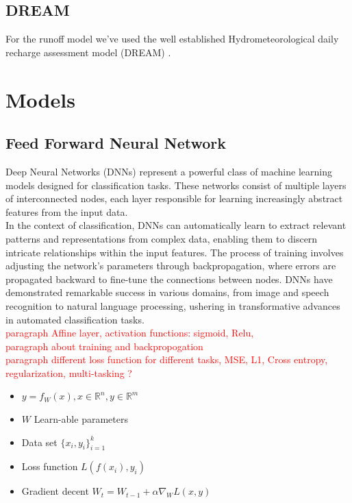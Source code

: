 \documentclass[12pt]{report}
\begin{document}
\subsection{DREAM}

For the runoff model we've used the well established Hydrometeorological daily recharge assessment model (DREAM) \cite{DREAM}.
\newpage
\section{Models}
\subsection{Feed Forward Neural Network}
Deep Neural Networks (DNNs) represent a powerful class of machine learning models designed for classification tasks. These networks consist of multiple layers of interconnected nodes, each layer responsible for learning increasingly abstract features from the input data.\\ 

In the context of classification, DNNs can automatically learn to extract relevant patterns and representations from complex data, enabling them to discern intricate relationships within the input features. The process of training involves adjusting the network's parameters through backpropagation, where errors are propagated backward to fine-tune the connections between nodes. DNNs have demonstrated remarkable success in various domains, from image and speech recognition to natural language processing, ushering in transformative advances in automated classification tasks.\\

\textcolor{red}{paragraph Affine layer, activation functions:  sigmoid, Relu, }\\

\textcolor{red}{paragraph about training and backpropogation}\\

\textcolor{red}{paragraph different loss function for different tasks, MSE, L1, Cross entropy, regularization, multi-tasking ?}\\




\begin{itemize}
	\item $y = f_{W}(x), x \in \mathbb{R}^n, y \in \mathbb{R}^m$ 
	\item $W$ Learn-able parameters
	\item Data set $\{x_i, y_i \}_{i=1}^k$
	\item Loss function $L(f(x_i), y_i)$
	\item Gradient decent $W_t = W_{t-1} + \alpha \nabla_{W}L(x,y) $ 
\end{itemize}
\end{document}
